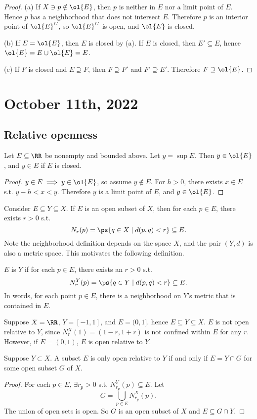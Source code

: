 \documentclass[11pt]{scrartcl}
\numberwithin{equation}{section}
\begin{document}
\begin{proof}
    (a) If $X\ni p\notin \ol{E}$, then $p$ is neither in $E$ nor a limit 
    point of $E$. Hence $p$ has a neighborhood that does not 
    intersect $E$. Therefore $p$ is an interior point of $\ol{E}^C$, so
    $\ol{E}^C$ is open, and $\ol{E}$ is closed.

    (b) If $E = \ol{E}$, then $E$ is closed by (a). If $E$ is closed,
    then $E'\subseteq E$, hence $\ol{E} = E\cup \ol{E} = E$.

    (c) If $F$ is closed and $E \supseteq F$, then $F\supseteq F'$
    and $F'\supseteq E'$. Therefore $F\supseteq \ol{E}$.
\end{proof}

\clearpage
\section{October 11th, 2022}
\subsection{Relative openness}
\begin{proposition}
    Let $E\subseteq \RR$ be nonempty and bounded above.
    Let $y=\sup E$. Then $y\in \ol{E}$, and $y \in E$ if $E$ 
    is closed.
\end{proposition}
\begin{proof}
    $y\in E\implies y\in\ol{E}$, so assume $y\notin E$. For $h>0$,
    there exists $x\in E$ s.t. $y-h<x<y$. Therefore $y$ is 
    a limit point of $E$, and $y\in\ol{E}$.
\end{proof}
Consider $E\subseteq Y \subseteq X$. If $E$ is an open subset of $X$, then 
for each $p\in E$, there exists $r>0$ s.t. 
\[N_r(p) = \ps{q\in X\mid d(p,q)<r}\subseteq E.\]
Note the neighborhood definition depends on the space $X$, and the pair 
$(Y,d)$ is also a metric space. This motivates the following definition.
\begin{definition}
    $E$ is  $Y$ if for each $p\in E$, there 
    exists an $r>0$ s.t.
    \[ N_r^Y(p) =\ps{q\in Y\mid d(p,q)<r}\subseteq E.\]
    In words, for each point $p\in E$, there is a neighborhood 
    on $Y$'s metric that is contained in $E$.
\end{definition}
\begin{example}
    Suppose $X=\RR$, $Y=[-1,1]$, and $E=(0,1]$. hence $E\subseteq Y\subseteq X$. $E$ is not open relative to $Y$, since $N_{r}^X(1)=(1-r,1+r)$
    is not confined within $E$ for any $r$.
    However, if $E=(0,1)$, $E$ is open relative to $Y$.
\end{example}
\begin{theorem}
    Suppose $Y\subset X$. A subset $E$ is only open relative to $Y$ if 
    and only if $E=Y\cap G$ for some open subset $G$ of $X$. 
\end{theorem}
\begin{proof}
    For each $p\in E$, $\exists r_p>0$ s.t. $N_{r_p}^Y(p) \subseteq E$.
    Let 
    \[ G=\bigcup_{p\in E}N_{r_p}^X(p).\] 
    The union of open sets is open. So $G$ is an open subset of $X$
    and $E\subseteq G\cap Y$. 
\end{proof}
\end{document}
